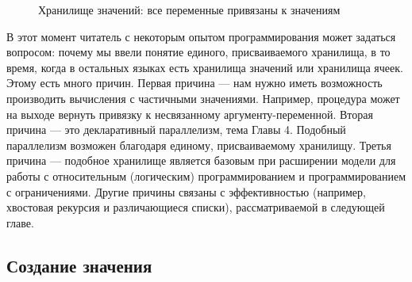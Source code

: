 \begin{figure}
\caption{Хранилище значений: все переменные привязаны к значениям}
\label{figure:all_variables_bound_to_values}
\end{figure}

В этот момент читатель с некоторым опытом программирования может задаться вопросом: почему мы ввели понятие единого, присваиваемого хранилища, в то время, когда в остальных языках есть хранилища значений или хранилища ячеек. Этому есть много причин. Первая причина --- нам нужно иметь возможность производить вычисления с частичными значениями. Например, процедура может на выходе вернуть привязку к несвязанному аргументу-переменной. Вторая причина --- это декларативный параллелизм, тема Главы 4. Подобный параллелизм возможен благодаря единому, присваиваемому хранилищу. Третья причина --- подобное хранилище является базовым при расширении модели для работы с относительным (логическим) программированием и программированием с ограничениями. Другие причины связаны с эффективностью (например, хвостовая рекурсия и различающиеся списки), рассматриваемой в следующей главе.

\subsection{Создание значения}

